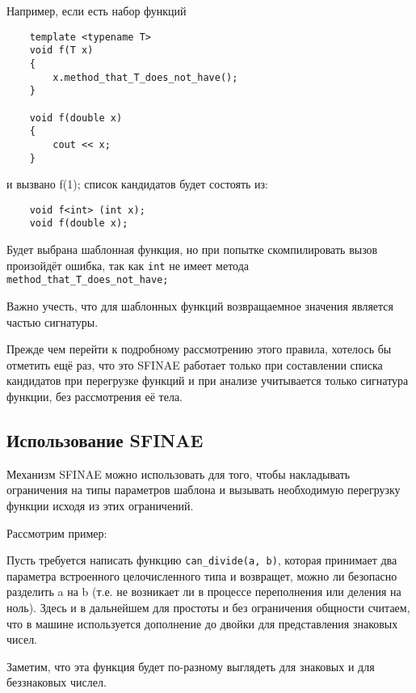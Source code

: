 	Например, если есть набор функций

	\begin{verbatim}
	template <typename T>
	void f(T x)
	{
	    x.method_that_T_does_not_have();
	}

	void f(double x)
	{
	    cout << x;
	}
	\end{verbatim}
	
	и вызвано f(1);
	список кандидатов будет состоять из:
	
	\begin{verbatim}
	void f<int> (int x);
	void f(double x);
	\end{verbatim}

	Будет выбрана шаблонная функция, но при попытке скомпилировать вызов произойдёт ошибка, так как \texttt{int} не имеет метода \texttt{method_that_T_does_not_have;}
	
	\vspace{\baselineskip}	
	
	Важно учесть, что для шаблонных функций возвращаемное значения является частью сигнатуры.

	Прежде чем перейти к подробному рассмотрению этого правила, хотелось бы отметить ещё раз, что это SFINAE работает только при составлении списка кандидатов при перегрузке функций и при анализе учитывается только сигнатура функции, без рассмотрения её тела.

\subsection{Использование SFINAE}

	Механизм SFINAE можно использовать для того, чтобы накладывать ограничения на типы параметров шаблона и вызывать необходимую перегрузку функции исходя из этих ограничений.
	
	Рассмотрим пример:

	Пусть требуется написать функцию \texttt{can_divide(a, b)}, которая принимает два параметра встроенного целочисленного типа и возвращет, можно ли безопасно разделить a на b (т.е. не возникает ли в процессе переполнения или деления на ноль). Здесь и в дальнейшем для простоты и без ограничения общности считаем, что в машине используется дополнение до двойки для представления знаковых чисел.
	
	Заметим, что эта функция будет по-разному выглядеть для знаковых и для беззнаковых числел.
	
